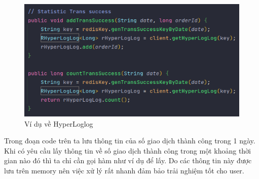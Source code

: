                 \begin{figure}[!ht]
			    \includegraphics[width=1\textwidth]{Images/hyperloglog.png}
			    \centering
			    \linebreak
			    \caption{Ví dụ về HyperLoglog}
	       	    \end{figure}
	       	
	       	    Trong đoạn code trên ta lưu thông tin của số giao dịch thành công trong 1 ngày. Khi có yêu cầu lấy thông tin về số giao dịch thành công trong một khoảng thời gian nào đó thì ta chỉ cần gọi hàm như ví dụ để lấy. Do các thông tin này được lưu trên memory nên việc xử lý rất nhanh đảm bảo trải nghiệm tốt cho user.
		  
		    
		    
		  

